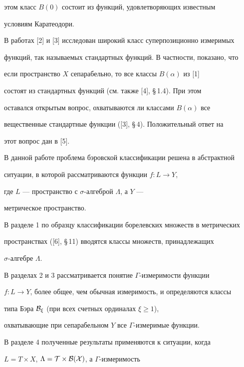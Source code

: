 этом класс $B(0)$ состоит из функций, удовлетворяющих известным 


условиям Каратеодори. 


 


В работах [2] и [3] исследован широкий класс суперпозиционно измеримых 


функций, так называемых стандартных функций. В частности, показано, что 


если пространство $X$ сепарабельно, то все классы $B(\alpha)$ из [1] 


состоят из стандартных функций (см. также [4], \S\,1.4). При этом 


оставался открытым вопрос, охватываются ли классами $B(\alpha)$ все 


вещественные стандартные функции ([3], \S\,4). Положительный ответ на 


этот вопрос дан в [5]. 


 


В данной работе проблема бэровской классификации решена в абстрактной 


ситуации, в которой рассматриваются функции $f:L\to Y$, 


где $L$ --- пространство с $\sigma$-алгеброй $\Lambda$, а $Y$ --- 


метрическое пространство. 


 


В разделе 1 по образцу классификации борелевских множеств в метрических 


пространствах ([6], \S\,11) вводятся классы множеств, принадлежащих 


$\sigma$-алгебре $\Lambda$. 


 


В разделах 2 и 3 рассматривается понятие $\Gamma$-измеримости функции 


$f:L\to Y$, более общее, чем обычная измеримость, и определяются классы 


типа Бэра $\cal B_\xi$ (при всех счетных ординалах $\xi\ge1$), 


охватывающие при сепарабельном $Y$ все $\Gamma$-измеримые функции. 


 


В разделе 4 полученные результаты применяются к ситуации, когда 


$L=T\times X$, $\Lambda=\cal T\times\cal B(X)$, а $\Gamma$-измеримость 


